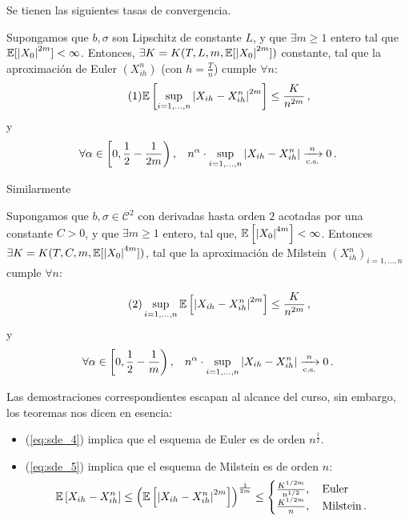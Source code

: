 Se tienen las siguientes tasas de convergencia. 
\begin{theorem}
Supongamos que $b, \sigma$ son Lipschitz de constante $L$, y que $\exists m \ge  1$ entero tal que $\mathbb{E} [\abs{X_0}^{2m}] < \infty$. Entonces, $\exists K = K(T,L,m,\mathbb{E}[\abs{X_0}^{2m}])$ constante, tal que la aproximación de Euler $(X_{ih}^{n})$ (con $h = \frac{T}{n}$) cumple $\forall n$: 
\begin{equation*}
\label{eq:sde_4}
\tag{1}
    \mathbb{E} \left[ \sup_{i = 1,\ldots, n} \abs{X_{ih} - X_{ih}^n}^{2m} \right] \le \frac{K}{n^{2m}}\,,
\end{equation*}
y
$$ \forall \alpha \in \left\lbrack 0, \frac{1}{2} - \frac{1}{2m} \right ), \hspace{.25cm}\, n^{\alpha} \cdot \sup_{i= 1 ,\ldots, n} \abs{X_{ih} - X_{ih}^{n}} \xrightarrow[\text{c.s.}]{n} 0 \,.$$
\end{theorem}

Similarmente
\begin{theorem}
Supongamos que $b, \sigma \in \mathcal{C}^2$ con derivadas hasta orden $2$ acotadas por una constante $C >0$, y que $\exists m \ge 1$ entero, tal que, $\mathbb{E} \left[\abs{X_0}^{4m} \right] < \infty$. Entonces $\exists K = K(T,C,m,\mathbb{E}[\abs{X_0}^{4m}])$, tal que la aproximación de Milstein $(X_{ih}^{n})_{i = 1, \ldots,n}$ cumple $\forall n$: 

\begin{equation*}
\label{eq:sde_5}
\tag{2}
    \sup_{i = 1,\ldots,n} \mathbb{E} \left[ \abs{X_{ih} - X_{ih}^{n}}^{2m}
\right] \le \frac{K}{n^{2m}}\,,
\end{equation*}
y
$$ \forall \alpha \in \left \lbrack 0, \frac{1}{2} - \frac{1}{m} \right), \hspace{.25cm}\,  n^{\alpha} \cdot \sup_{i= 1 ,\ldots, n} \abs{X_{ih} - X_{ih}^{n}} \xrightarrow[\text{c.s.}]{n} 0 \,.$$
\end{theorem}

Las demostraciones correspondientes escapan al alcance del curso, sin embargo, los teoremas nos dicen en esencia: 
\begin{itemize}
\item (\ref{eq:sde_4}) implica que el esquema de Euler es de orden $n^{\frac{1}{2}}$. 
\item (\ref{eq:sde_5}) implica que el esquema de Milstein es de orden $n$: 
\begin{equation*}
    \mathbb{E} \left[ X_{ih} - X_{ih}^{n} \right] \le  \left( \mathbb{E} \left[ \abs{X_{ih} - X_{ih}^{n}}^{2m} \right] \right)^{\frac{1}{2m}} \le  
    \begin{cases}
        \frac{K^{1/2m}}{n^{1/2}}, ~ ~ ~ \text{Euler} \\
        \frac{K^{1/2m}}{n}, ~ ~ ~ \text{Milstein} \,.
    \end{cases}
\end{equation*}
\end{itemize}

